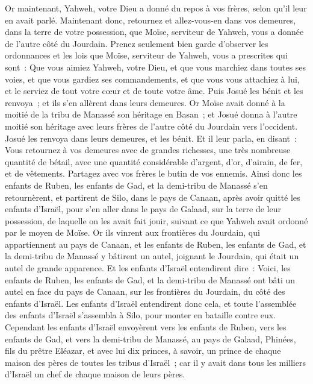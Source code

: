 \begin{multicols}{2}
Or maintenant, Yahweh, votre Dieu a donné du repos à vos frères, selon qu'il leur en avait parlé. Maintenant donc, retournez et allez-vous-en dans vos demeures, dans la terre de votre possession, que Moïse, serviteur de Yahweh, vous a donnée de l'autre côté du Jourdain.
Prenez seulement bien garde d'observer les ordonnances et les lois que Moïse, serviteur de Yahweh, vous a prescrites qui sont~: Que vous aimiez Yahweh, votre Dieu, et que vous marchiez dans toutes ses voies, et que vous gardiez ses commandements, et que vous vous attachiez à lui, et le serviez de tout votre cœur et de toute votre âme.
Puis Josué les bénit et les renvoya~; et ils s'en allèrent dans leurs demeures.
Or Moïse avait donné à la moitié de la tribu de Manassé son héritage en Basan~; et Josué donna à l'autre moitié son héritage avec leurs frères de l'autre côté du Jourdain vers l'occident. Josué les renvoya dans leurs demeures, et les bénit.
Et il leur parla, en disant~: Vous retournez à vos demeures avec de grandes richesses, une très nombreuse quantité de bétail, avec une quantité considérable d'argent, d'or, d'airain, de fer, et de vêtements. Partagez avec vos frères le butin de vos ennemis.
Ainsi donc les enfants de Ruben, les enfants de Gad, et la demi-tribu de Manassé s'en retournèrent, et partirent de Silo, dans le pays de Canaan, après avoir quitté les enfants d'Israël, pour s'en aller dans le pays de Galaad, sur la terre de leur possession, de laquelle on les avait fait jouir, suivant ce que Yahweh avait ordonné par le moyen de Moïse.
Or ils vinrent aux frontières du Jourdain, qui appartiennent au pays de Canaan, et les enfants de Ruben, les enfants de Gad, et la demi-tribu de Manassé y bâtirent un autel, joignant le Jourdain, qui était un autel de grande apparence.
Et les enfants d'Israël entendirent dire~: Voici, les enfants de Ruben, les enfants de Gad, et la demi-tribu de Manassé ont bâti un autel en face du pays de Canaan, sur les frontières du Jourdain, du côté des enfants d'Israël.
Les enfants d'Israël entendirent donc cela, et toute l'assemblée des enfants d'Israël s'assembla à Silo, pour monter en bataille contre eux.
Cependant les enfants d'Israël envoyèrent vers les enfants de Ruben, vers les enfants de Gad, et vers la demi-tribu de Manassé, au pays de Galaad, Phinées, fils du prêtre Eléazar,
et avec lui dix princes, à savoir, un prince de chaque maison des pères de toutes les tribus d'Israël~; car il y avait dans tous les milliers d'Israël un chef de chaque maison de leurs pères.

\end{multicols}
